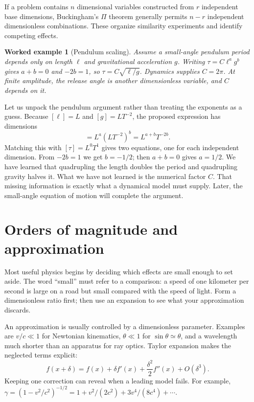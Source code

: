 \documentclass[11pt,oneside]{book}
\theoremstyle{reviewstyle}
\newtheorem{example}{Worked example}[chapter]
\begin{document}
If a problem contains $n$ dimensional variables constructed from $r$ independent base dimensions, Buckingham's $\Pi$ theorem generally permits $n-r$ independent dimensionless combinations. These organize similarity experiments and identify competing effects.
\begin{example}[Pendulum scaling]
Assume a small-angle pendulum period depends only on length $\ell$ and gravitational acceleration $g$. Writing $\tau=C\ell^ag^b$ gives $a+b=0$ and $-2b=1$, so $\tau=C\sqrt{\ell/g}$. Dynamics supplies $C=2\pi$. At finite amplitude, the release angle is another dimensionless variable, and $C$ depends on it.
\end{example}

Let us unpack the pendulum argument rather than treating the exponents as a guess. Because $[\ell]=L$ and $[g]=LT^{-2}$, the proposed expression has dimensions
\begin{equation}
[\ell^ag^b]=L^a(LT^{-2})^b=L^{a+b}T^{-2b}.
\end{equation}
Matching this with $[\tau]=L^0T^1$ gives two equations, one for each independent dimension. From $-2b=1$ we get $b=-1/2$; then $a+b=0$ gives $a=1/2$. We have learned that quadrupling the length doubles the period and quadrupling gravity halves it. What we have not learned is the numerical factor $C$. That missing information is exactly what a dynamical model must supply. Later, the small-angle equation of motion will complete the argument.

\section{Orders of magnitude and approximation}
Most useful physics begins by deciding which effects are small enough to set aside. The word ``small'' must refer to a comparison: a speed of one kilometer per second is large on a road but small compared with the speed of light. Form a dimensionless ratio first; then use an expansion to see what your approximation discards.

An approximation is usually controlled by a dimensionless parameter. Examples are $v/c\ll1$ for Newtonian kinematics, $\theta\ll1$ for $\sin\theta\simeq\theta$, and a wavelength much shorter than an apparatus for ray optics. Taylor expansion makes the neglected terms explicit:
\begin{equation}
f(x+\delta)=f(x)+\delta f'(x)+\frac{\delta^2}{2}f''(x)+O(\delta^3).
\end{equation}
Keeping one correction can reveal when a leading model fails. For example,
$\gamma=(1-v^2/c^2)^{-1/2}=1+v^2/(2c^2)+3v^4/(8c^4)+\cdots$.
\end{document}
